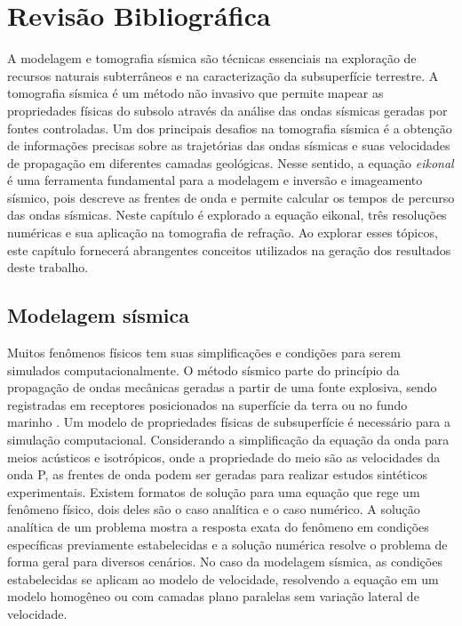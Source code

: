\chapter{Revisão Bibliográfica}
\label{ch:revisaobibliografica}

A modelagem e tomografia sísmica são técnicas essenciais na exploração de recursos naturais subterrâneos e na caracterização da subsuperfície terrestre. A tomografia sísmica é um método não invasivo que permite mapear as propriedades físicas do subsolo através da análise das ondas sísmicas geradas por fontes controladas. Um dos principais desafios na tomografia sísmica é a obtenção de informações precisas sobre as trajetórias das ondas sísmicas e suas velocidades de propagação em diferentes camadas geológicas. Nesse sentido, a equação \textit{eikonal}  é uma ferramenta fundamental para a modelagem e inversão e imageamento sísmico, pois descreve as frentes de onda e permite calcular os tempos de percurso das ondas sísmicas. Neste capítulo é explorado a equação eikonal, três resoluções numéricas e sua aplicação na tomografia de refração. Ao explorar esses tópicos, este capítulo fornecerá abrangentes conceitos utilizados na geração dos resultados deste trabalho.

\section{Modelagem sísmica}

Muitos fenômenos físicos tem suas simplificações e condições para serem simulados computacionalmente. O método sísmico parte do princípio da propagação de ondas mecânicas geradas a partir de uma fonte explosiva, sendo registradas em receptores posicionados na superfície da terra ou no fundo marinho \cite{sheriff1995exploration, rosa2010analise}. Um modelo de propriedades físicas de subsuperfície é necessário para a simulação computacional. Considerando a simplificação da equação da onda para meios acústicos e isotrópicos, onde a propriedade do meio são as velocidades da onda P, as frentes de onda podem ser geradas para realizar estudos sintéticos experimentais. Existem formatos de solução para uma equação que rege um fenômeno físico, dois deles são o caso analítica e o caso numérico. A solução analítica de um problema mostra a resposta exata do fenômeno em condições específicas previamente estabelecidas e a solução numérica resolve o problema de forma geral para diversos cenários. No caso da modelagem sísmica, as condições estabelecidas se aplicam ao modelo de velocidade, resolvendo a equação em um modelo homogêneo ou com camadas plano paralelas sem variação lateral de velocidade.  

